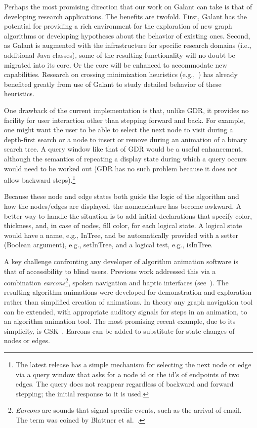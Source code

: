 Perhaps the most promising direction that our work on Galant can take is
that of developing research applications.
The benefits are twofold.
First, Galant has the potential for providing a rich environment for
the exploration of new graph algorithms or developing hypotheses about the
behavior of existing ones.
Second, as Galant is augmented with the infrastructure for specific research
domains (i.e., additional Java classes), some of the resulting functionality
will no doubt be migrated into its core. Or the core will be enhanced to
accommodate new capabilities.
Research on crossing minimization heuristics (e.g.,~\cite{2016-SEA-Stallmann}) has
already benefited greatly from use of Galant to study detailed behavior of these heuristics.

One drawback of the current implementation is
that, unlike GDR, it provides no facility for user interaction other than stepping forward
and back.
For example, one might want the user to be able to select the next node to
visit during a depth-first search or a node to insert or remove during an animation of
a binary search tree.
A query window like that of GDR would be a useful enhancement, although the semantics of
repeating a display state during which a query occurs would need to be worked out
(GDR has no such problem because it does not allow backward steps).\footnote{
  The latest release has a simple mechanism for selecting the next node or edge
  via a query window that asks for a node id or the id's of endpoints of two edges.
  The query does not reappear regardless of backward and forward stepping;
  the initial response to it is used.
}

  Because these node and edge states both guide the logic of the algorithm
  and how the nodes/edges are displayed, the nomenclature has become awkward.
  A better way to handle the situation is to add initial declarations
  that specify color, thickness, and, in case of nodes, fill color, for each logical state.
  A logical state would have a name, e.g., \textsf{InTree},
  and be automatically provided with a setter (Boolean argument),
  e.g., \textsf{setInTree}, and a logical test, e.g., \textsf{isInTree}.

A key challenge confronting any developer of algorithm animation
software is that of accessibility to blind users.
Previous work addressed this via a combination \emph{earcons}\footnote{
\emph{Earcons} are sounds that signal specific events, such as the arrival of email. The term was coined by Blattner et al.~\cite{1989-HCI-Blattner-earcons}.
}, spoken navigation
and haptic interfaces
(see~\cite{2002-SoftViz-Baloian,2005-SCCC-Baloian,2002-Diagrams-Bennett}).
The resulting algorithm animations were developed for demonstration and exploration rather than simplified
creation of
animations.
In theory any graph navigation tool can be extended, with appropriate auditory
signals for steps in an animation, to an algorithm animation tool.
The most promising recent example, due to its simplicity, is GSK~\cite{2013-SIGCSE-Balik}.
Earcons can be added to substitute for state changes of nodes or edges.

